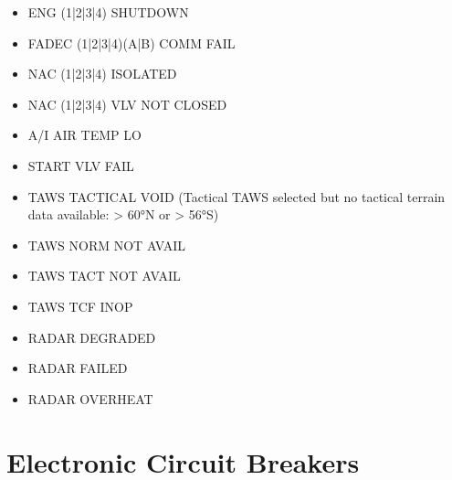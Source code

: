\begin{itemize}
\item ENG (1|2|3|4) SHUTDOWN
\item FADEC (1|2|3|4)(A|B) COMM FAIL
\item NAC (1|2|3|4) ISOLATED
\item NAC (1|2|3|4) VLV NOT CLOSED
\item A/I AIR TEMP LO
\item START VLV FAIL
\item TAWS TACTICAL VOID (Tactical TAWS selected but no tactical terrain data available: > 60°N or > 56°S)
\item TAWS NORM NOT AVAIL
\item TAWS TACT NOT AVAIL
\item TAWS TCF INOP
\item RADAR DEGRADED
\item RADAR FAILED
\item RADAR OVERHEAT
\end{itemize}

\chapter{Electronic Circuit Breakers}
\label{sec:ecbs}


